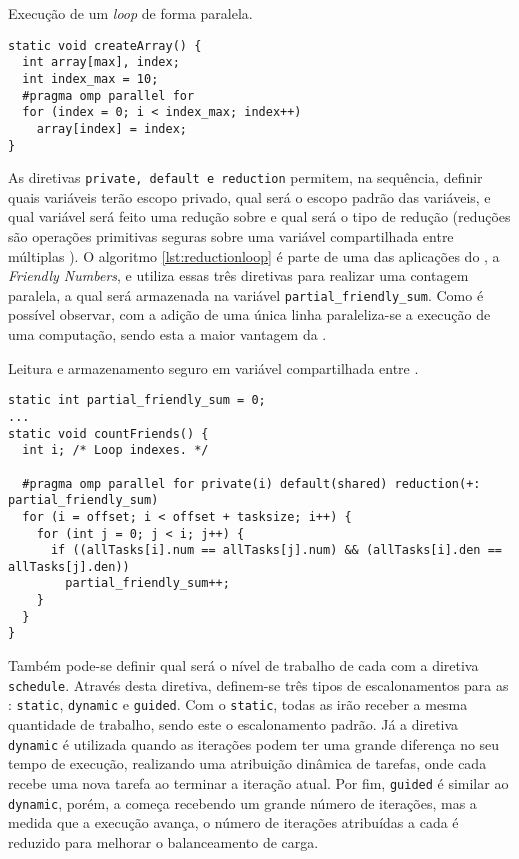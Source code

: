 \begin{listing}[tb]
\caption{Execução de um \textit{loop} de forma paralela.}
\label{lst:parallelloop}
\begin{verbatim}
static void createArray() {
  int array[max], index;
  int index_max = 10;
  #pragma omp parallel for
  for (index = 0; i < index_max; index++)
    array[index] = index;
}
\end{verbatim}
\end{listing}

As diretivas \texttt{private, default e reduction} permitem, na sequência, definir quais variáveis terão escopo privado, qual será o escopo padrão das variáveis, e qual variável será feito uma redução sobre e qual será o tipo de redução (reduções são operações primitivas seguras sobre uma variável compartilhada entre múltiplas \threads). O algoritmo \ref{lst:reductionloop} é parte de uma das aplicações do \capb, a \textit{Friendly Numbers}, e utiliza essas três diretivas para realizar uma contagem paralela, a qual será armazenada na variável \texttt{partial\_friendly\_sum}. Como é possível observar, com a adição de uma única linha paraleliza-se a execução de uma computação, sendo esta a maior vantagem da \OpenMP.

\begin{listing}[tb]
\caption{Leitura e armazenamento seguro em variável compartilhada entre \threads.}
\label{lst:reductionloop}
\begin{verbatim}
static int partial_friendly_sum = 0;
...
static void countFriends() {
  int i; /* Loop indexes. */

  #pragma omp parallel for private(i) default(shared) reduction(+: partial_friendly_sum)
  for (i = offset; i < offset + tasksize; i++) {
    for (int j = 0; j < i; j++) {
      if ((allTasks[i].num == allTasks[j].num) && (allTasks[i].den == allTasks[j].den))
        partial_friendly_sum++;
    }
  }
}
\end{verbatim}
\end{listing}

Também pode-se definir qual será o nível de trabalho de cada \thread com a diretiva \texttt{schedule}. Através desta diretiva, definem-se três tipos de escalonamentos para as \threads: \texttt{static}, \texttt{dynamic} e \texttt{guided}. Com o \texttt{static}, todas as \threads irão receber a mesma quantidade de trabalho, sendo este o escalonamento padrão. Já a diretiva \texttt{dynamic} é utilizada quando as iterações podem ter uma grande diferença no seu tempo de execução, realizando uma atribuição dinâmica de tarefas, onde cada \thread recebe uma nova tarefa ao terminar a iteração atual. Por fim, \texttt{guided} é similar ao \texttt{dynamic}, porém, a \thread começa recebendo um grande número de iterações, mas a medida que a execução avança, o número de iterações atribuídas a cada \thread é reduzido para melhorar o balanceamento de carga.

